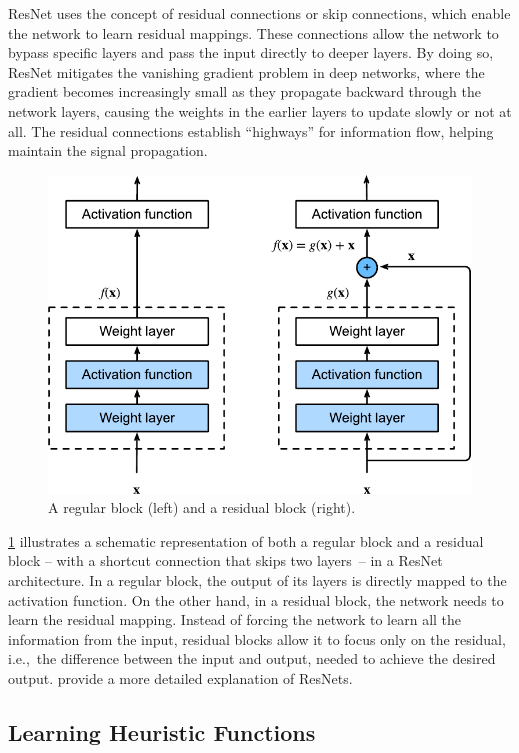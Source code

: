 ResNet uses the concept of residual connections or skip connections, which enable the network to learn residual mappings. These connections allow the network to bypass specific layers and pass the input directly to deeper layers. By doing so, ResNet mitigates the vanishing gradient problem in deep networks, where the gradient becomes increasingly small as they propagate backward through the network layers, causing the weights in the earlier layers to update slowly or not at all. The residual connections establish ``highways'' for information flow, helping maintain the signal propagation.

\begin{figure}[tb]
    \caption[A regular block and a residual block.]{A regular block (left) and a residual block (right).}
    \label{fig:residual-block}
    \addmargin
    \centering
    \includegraphics[width=0.75\linewidth]{figures/residual-block.pdf}
\end{figure}

\cref{fig:residual-block} illustrates a schematic representation of both a regular block and a residual block -- with a shortcut connection that skips two layers~-- in a ResNet architecture. In a regular block, the output of its layers is directly mapped to the activation function. On the other hand, in a residual block, the network needs to learn the residual mapping. Instead of forcing the network to learn all the information from the input, residual blocks allow it to focus only on the residual, i.e.,~the difference between the input and output, needed to achieve the desired output. \citet{he2016deep} provide a more detailed explanation of ResNets.

\subsection{Learning Heuristic Functions}
\label{sec:learning-heuristics}

